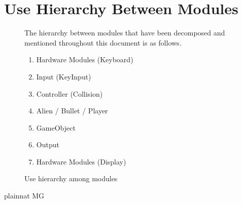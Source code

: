 \documentclass[12pt, titlepage]{article}
\begin{document}
\section{Use Hierarchy Between Modules} \label{SecUse}
\begin{figure}[H]
The hierarchy between modules that have been decomposed and mentioned throughout this document is as follows.
\begin{enumerate}
\item Hardware Modules (Keyboard)  
\item  Input (KeyInput) 
\item Controller (Collision) 
\item Alien / Bullet / Player 
\item GameObject 
\item Output 
\item Hardware Modules (Display)
\end{enumerate}
\caption{Use hierarchy among modules}
\label{FigUH}
\end{figure}
 {plainnat}
 {MG}
\end{document}
